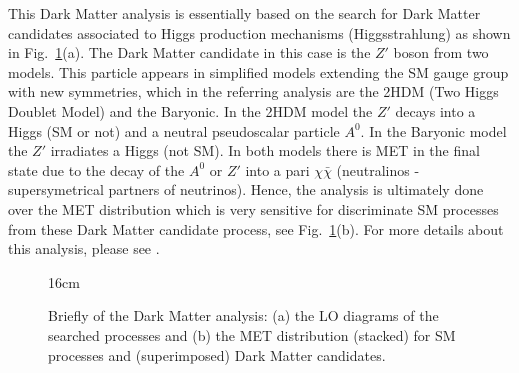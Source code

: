 This Dark Matter analysis is essentially based on the search for Dark Matter candidates associated to Higgs production mechanisms (Higgsstrahlung) as shown in Fig.~\ref{fig:dm_plots}(a). The Dark Matter candidate in this case is the $Z'$ boson from two models. This particle appears in simplified models extending the SM gauge group with new symmetries, which in the referring analysis are the 2HDM (Two Higgs Doublet Model) and the Baryonic. In the 2HDM model the $Z'$ decays into a Higgs (SM or not) and a neutral pseudoscalar particle $A^{0}$. In the Baryonic model the $Z'$ irradiates a Higgs (not SM). In both models there is MET in the final state due to the decay of the $A^{0}$ or $Z'$ into a pari $\chi\bar{\chi}$ (neutralinos - supersymetrical partners of neutrinos). Hence, the analysis is ultimately done over the MET distribution which is very sensitive for discriminate SM processes from these Dark Matter candidate process, see Fig.~\ref{fig:dm_plots}(b). For more details about this analysis, please see \cite{bib:CMS-AN-16-328}.

\begin{figure}[htbp]{16cm}
	\caption{Briefly of the Dark Matter analysis: (a) the LO diagrams of the searched processes and (b) the MET distribution (stacked) for SM processes and (superimposed) Dark Matter candidates.}
	\centering
	\quad\quad
	\label{fig:dm_plots}
\end{figure}

